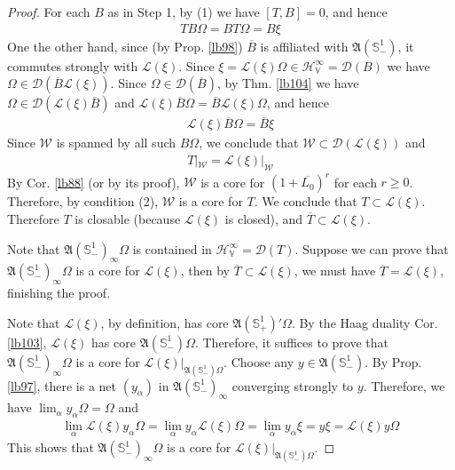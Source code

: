 \documentclass[12pt,b5paper,notitlepage]{article}
\theoremstyle{definition}
\theoremstyle{plain}
\newcommand{\fk}{\mathfrak}
\newcommand{\mc}{\mathcal}
\newcommand{\ovl}{\overline}
\newcommand{\Dom}{\scr{D}}
\newcommand{\scr}{\mathscr}
\newcommand{\Sbb}{{\mathbb S}}
\newcommand{\HV}{\mathcal H_{\mathbb V}}
\numberwithin{equation}{section}
\begin{document}
\begin{proof}
For each $B$ as in Step 1, by (1) we have $[T,B]=0$, and hence
\begin{align*}
TB\Omega=BT\Omega=B\xi
\end{align*}
One the other hand, since (by Prop. \ref{lb98}) $\ovl B$ is affiliated with $\fk A(\Sbb^1_-)$, it commutes strongly with $\scr L(\xi)$. Since $\xi=\scr L(\xi)\Omega\in\HV^\infty=\Dom(B)$ we have $\Omega\in\Dom(\ovl B\scr L(\xi))$. Since $\Omega\in\Dom(\ovl B)$, by Thm. \ref{lb104} we have $\Omega\in\Dom(\scr L(\xi)\ovl B)$ and $\scr L(\xi)\ovl B\Omega=\ovl B\scr L(\xi)\Omega$, and hence 
\begin{align*}
\scr L(\xi)\ovl B\Omega=\ovl B\xi
\end{align*}
Since $\mc W$ is spanned by all such $B\Omega$, we conclude that $\mc W\subset\Dom(\scr L(\xi))$ and
\begin{align*}
T|_{\mc W}=\scr L(\xi)|_{\mc W}
\end{align*}
By Cor. \ref{lb88} (or by its proof), $\mc W$ is a core for $(1+\ovl{L_0})^r$ for each $r\geq0$. Therefore, by condition (2), $\mc W$ is a core for $T$. We conclude that $T\subset \scr L(\xi)$. Therefore $T$ is closable (because $\scr L(\xi)$ is closed), and $\ovl T\subset\scr L(\xi)$.




Note that $\fk A(\Sbb^1_-)_\infty\Omega$ is contained in $\HV^\infty=\Dom(T)$. Suppose we can prove that $\fk A(\Sbb^1_-)_\infty\Omega$ is a core for $\scr L(\xi)$, then by $\ovl T\subset\scr L(\xi)$, we must have $\ovl T=\scr L(\xi)$, finishing the proof.

Note that $\scr L(\xi)$, by definition, has core $\fk A(\Sbb^1_+)'\Omega$. By the Haag duality Cor. \ref{lb103}, $\scr L(\xi)$ has core $\fk A(\Sbb^1_-)\Omega$. Therefore, it suffices to prove that $\fk A(\Sbb^1_-)_\infty\Omega$ is a core for $\scr L(\xi)\big|_{\fk A(\Sbb^1_-)\Omega}$. Choose any $y\in\fk A(\Sbb^1_-)$. By Prop. \ref{lb97}, there is a net $(y_\alpha)$ in $\fk A(\Sbb^1_-)_\infty$ converging strongly to $y$. Therefore, we have $\lim_\alpha y_\alpha\Omega=\Omega$ and
\begin{align*}
\lim_\alpha\scr L(\xi)y_\alpha\Omega=\lim_\alpha y_\alpha \scr L(\xi)\Omega=\lim_\alpha y_\alpha\xi=y\xi=\scr L(\xi)y\Omega
\end{align*}
This shows that $\fk A(\Sbb^1_-)_\infty\Omega$ is a core for $\scr L(\xi)|_{\fk A(\Sbb^1_-)\Omega}$.
\end{proof}


\subsection{}
\end{document}
